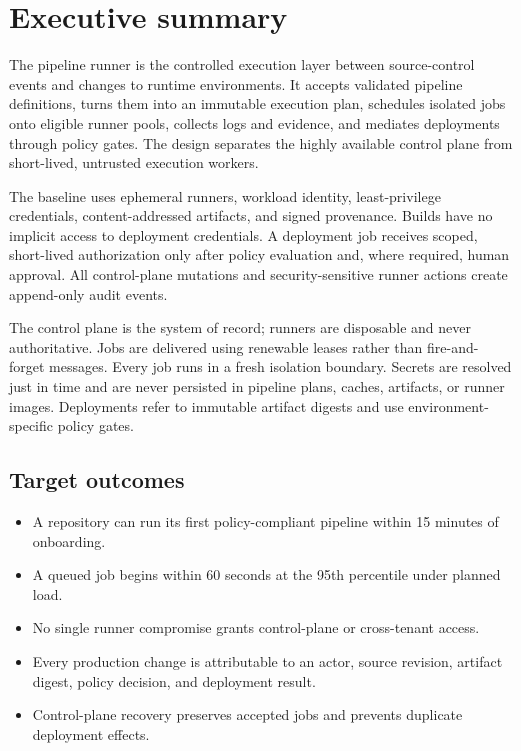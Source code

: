 \section{Executive summary}

The pipeline runner is the controlled execution layer between source-control events
and changes to runtime environments. It accepts validated pipeline definitions,
turns them into an immutable execution plan, schedules isolated jobs onto eligible
runner pools, collects logs and evidence, and mediates deployments through policy
gates. The design separates the highly available control plane from short-lived,
untrusted execution workers.

The baseline uses ephemeral runners, workload identity, least-privilege credentials,
content-addressed artifacts, and signed provenance. Builds have no implicit access to
deployment credentials. A deployment job receives scoped, short-lived authorization
only after policy evaluation and, where required, human approval. All control-plane
mutations and security-sensitive runner actions create append-only audit events.

\begin{decisionbox}
The control plane is the system of record; runners are disposable and never authoritative.
Jobs are delivered using renewable leases rather than fire-and-forget messages.
Every job runs in a fresh isolation boundary. Secrets are resolved just in time and are
never persisted in pipeline plans, caches, artifacts, or runner images. Deployments refer
to immutable artifact digests and use environment-specific policy gates.
\end{decisionbox}

\subsection{Target outcomes}

\begin{itemize}
  \item A repository can run its first policy-compliant pipeline within 15 minutes of onboarding.
  \item A queued job begins within 60 seconds at the 95th percentile under planned load.
  \item No single runner compromise grants control-plane or cross-tenant access.
  \item Every production change is attributable to an actor, source revision, artifact digest,
        policy decision, and deployment result.
  \item Control-plane recovery preserves accepted jobs and prevents duplicate deployment effects.
\end{itemize}

